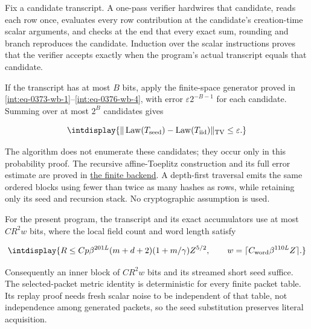 
Fix a candidate transcript. A one-pass verifier hardwires that candidate, reads each row once, evaluates every row contribution at the candidate's creation-time scalar arguments, and checks at the end that every exact sum, rounding and branch reproduces the candidate. Induction over the scalar instructions proves that the verifier accepts exactly when the program's actual transcript equals that candidate.



If the transcript has at most \(B\) bits, apply the finite-space generator proved in \eqref{int:eq-0373-wb-1}--\allowbreak \eqref{int:eq-0376-wb-4}, with error \(\varepsilon2^{-B-1}\) for each candidate. Summing over at most \(2^B\) candidates gives


\begingroup\renewcommand{\theHequation}{intdisplay.769}
\begin{equation}
\intdisplay{
\|\operatorname{Law}(T_{\rm seed})-
  \operatorname{Law}(T_{\rm iid})\|_{\rm TV}\le\varepsilon.
}
\label{int:eq-0368-seeded-transcript-transfer}
\end{equation}
\endgroup


The algorithm does not enumerate these candidates; they occur only in this probability proof. The recursive affine-Toeplitz construction and its full error estimate are proved in \hyperref[int:decoder-finite-backends]{the finite backend}. A depth-first traversal emits the same ordered blocks using fewer than twice as many hashes as rows, while retaining only its seed and recursion stack. No cryptographic assumption is used.



For the present program, the transcript and its exact accumulators use at most \(CR^2w\) bits, where the local field count and word length satisfy


\begingroup\renewcommand{\theHequation}{intdisplay.770}
\begin{equation}
\intdisplay{
R\le Cp\beta^{201L}(m+d+2)(1+m/\gamma)Z^{5/2},
\qquad
w=\lceil C_{\rm word}\beta^{110L}Z\rceil.
}
\label{int:eq-0369-seeded-local-resources}
\end{equation}
\endgroup


Consequently an inner block of \(CR^2w\) bits and its streamed short seed suffice. The selected-packet metric identity is deterministic for every finite packet table. Its replay proof needs fresh scalar noise to be independent of that table, not independence among generated packets, so the seed substitution preserves literal acquisition.


